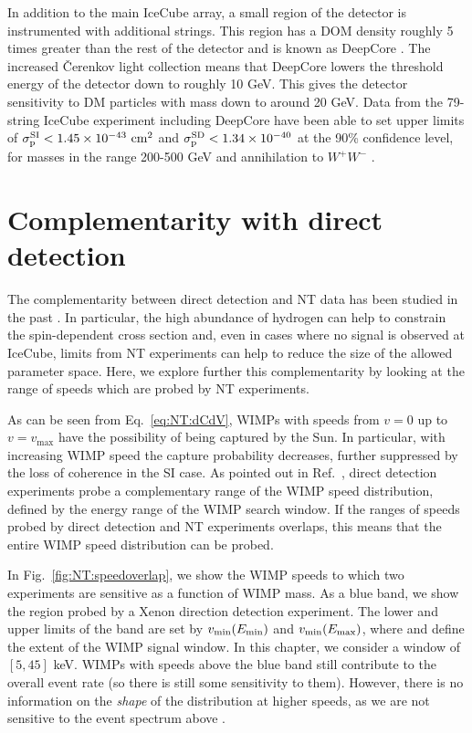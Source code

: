 In addition to the main IceCube array, a small region of the detector is instrumented with additional strings. This region has a DOM density roughly 5 times greater than the rest of the detector and is known as DeepCore \cite{Abbasi:2012}. The increased \v{C}erenkov light collection means that DeepCore lowers the threshold energy of the detector down to roughly 10 GeV. This gives the detector sensitivity to DM particles with mass down to around 20 GeV. Data from the 79-string IceCube experiment including DeepCore have been able to set upper limits of $\sigmapsi < 1.45 \times 10^{-43} \cmsq$ and $\sigmapsd < 1.34 \times 10^{-40}$ at the 90\% confidence level, for masses in the range 200-500 GeV and annihilation to $W^{+}W^{-}$ \cite{Aartsen:2013c}.


\section{Complementarity with direct detection}
\label{sec:NT:complementarity}
The complementarity between direct detection and NT data has been studied in the past \cite{Arina:2013}. In particular, the high abundance of hydrogen can help to constrain the spin-dependent cross section and, even in cases where no signal is observed at IceCube, limits from NT experiments can help to reduce the size of the allowed parameter space. Here, we explore further this complementarity by looking at the range of speeds which are probed by NT experiments.

As can be seen from Eq.~\ref{eq:NT:dCdV}, WIMPs with speeds from $v=0$ up to $v=v_\textrm{max}$ have the possibility of being captured by the Sun. In particular, with increasing WIMP speed the capture probability decreases, further suppressed by the loss of coherence in the SI case. As pointed out in Ref.~\cite{Choi:2014}, direct detection experiments probe a complementary range of the WIMP speed distribution, defined by the energy range of the WIMP search window. If the ranges of speeds probed by direct detection and NT experiments overlaps, this means that the entire WIMP speed distribution can be probed.

In Fig.~\ref{fig:NT:speedoverlap}, we show the WIMP speeds to which two experiments are sensitive as a function of WIMP mass. As a blue band, we show the region probed by a Xenon direction detection experiment. The lower and upper limits of the band are set by $v_\textrm{min}(\Emin)$ and $v_\textrm{min}(\Emax)$, where \Emin and \Emax define the extent of the WIMP signal window. In this chapter, we consider a window of $[5,45]$ keV. WIMPs with speeds above the blue band still contribute to the overall event rate (so there is still some sensitivity to them). However, there is no information on the \textit{shape} of the distribution at higher speeds, as we are not sensitive to the event spectrum above \Emax.


